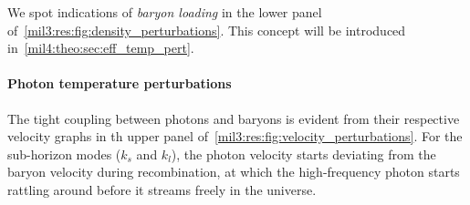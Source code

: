 We spot indications of \textit{baryon loading} in the lower panel of~\cref{mil3:res:fig:density_perturbations}. This concept will be introduced in~\cref{mil4:theo:sec:eff_temp_pert}. 










\paragraph{Photon temperature perturbations}
The tight coupling between photons and baryons is evident from their respective velocity graphs in th upper panel of~\cref{mil3:res:fig:velocity_perturbations}. For the sub-horizon modes ($k_s$ and $k_l$), the photon velocity starts deviating from the baryon velocity during recombination, at which the high-frequency photon starts rattling around before it streams freely in the universe.


